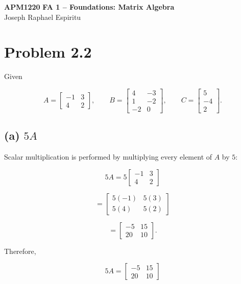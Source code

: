 \documentclass[12pt]{article}
\begin{document}
	
	\begin{center}
		{\large\textbf{APM1220}} \quad
		\textbf{FA 1 -- Foundations: Matrix Algebra} \quad 
		\\ Joseph Raphael Espiritu
	\end{center}
	
	\vspace{-0.3em}
	
	\section*{Problem 2.2}
	
	Given
	
	\[
	A =
	\begin{bmatrix}
		-1 & 3\\
		4 & 2
	\end{bmatrix},
	\qquad
	B =
	\begin{bmatrix}
		4 & -3\\
		1 & -2\\
		-2 & 0
	\end{bmatrix},
	\qquad
	C =
	\begin{bmatrix}
		5\\
		-4\\
		2
	\end{bmatrix}.
	\]
	
	\subsection*{(a) $5A$}
	
	Scalar multiplication is performed by multiplying every element of $A$
	by $5$:
	
	\[
	5A
	=
	5
	\begin{bmatrix}
		-1 & 3\\
		4 & 2
	\end{bmatrix}
	\]
	
	\[
	=
	\begin{bmatrix}
		5(-1) & 5(3)\\
		5(4) & 5(2)
	\end{bmatrix}
	\]
	
	\[
	=
	\begin{bmatrix}
		-5 & 15\\
		20 & 10
	\end{bmatrix}.
	\]
	
	Therefore,
	
	\[
	\boxed{
		5A =
		\begin{bmatrix}
			-5 & 15\\
			20 & 10
	\end{bmatrix}}
	\]
	
\end{document}
